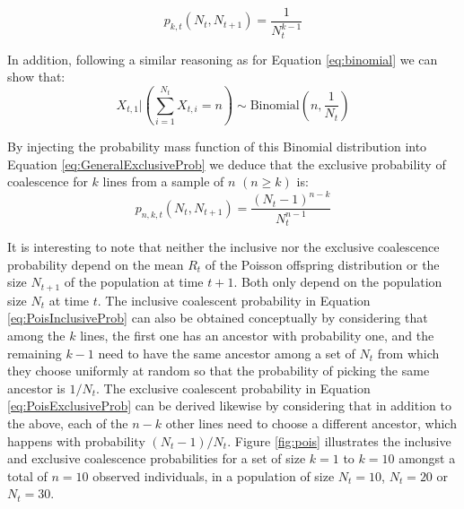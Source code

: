 \documentclass{article}
\renewcommand{\eqref}[1]{\ref{#1}}
\begin{document}
\begin{equation}
	p_{k,t}(N_t, N_{t+1})=\frac{1}{N_t^{k-1}}\label{eq:PoisInclusiveProb}
\end{equation}

In addition, following a similar reasoning as for Equation \eqref{eq:binomial} we can show that:
\begin{equation}
X_{t,1} \bigg| \left(\sum_{i=1}^{N_t} X_{t,i} = n\right) \sim \text{Binomial}\left(n, \frac{1}{N_t}\right)
\end{equation}

By injecting the probability mass function of this Binomial distribution 
into Equation \eqref{eq:GeneralExclusiveProb} we deduce that 
the exclusive probability of coalescence for $k$ lines from a sample of $n$ $(n \geq k)$ is:
	\begin{equation}
		p_{n,k,t}(N_t, N_{t+1}) = \frac{(N_t-1)^{n-k}}{N_t^{n-1}}\label{eq:PoisExclusiveProb}
	\end{equation}
	
It is interesting to note that neither the inclusive nor the exclusive coalescence probability
depend on the mean $R_t$ of the Poisson offspring distribution or the size $N_{t+1}$
of the population at time $t+1$. Both only depend on the population size $N_t$ at time $t$.
The inclusive coalescent probability in Equation \eqref{eq:PoisInclusiveProb}
can also be obtained conceptually by considering
that among the $k$ lines, the first one has an ancestor with probability one, 
and the remaining $k-1$ need to have the same ancestor among a set of $N_t$ from
which they choose uniformly at random so that the probability of picking the same ancestor
is $1/N_t$. The exclusive coalescent probability in Equation \eqref{eq:PoisExclusiveProb} 
can be derived likewise by considering
that in addition to the above, each of the $n-k$ other lines need to choose a different
ancestor, which happens with probability $(N_t-1)/N_t$.
Figure \ref{fig:pois} illustrates the inclusive and exclusive coalescence probabilities 
for a set of size $k=1$ to $k=10$ amongst a total of $n=10$ observed
individuals, in a population of size $N_t=10$, $N_t=20$ or $N_t=30$. 
\end{document}
